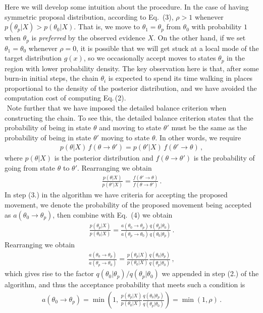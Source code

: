\documentclass[11pt]{article}
\theoremstyle{break}
\theoremstyle{break}
\begin{document}
${}$\qquad Here we will develop some intuition about the procedure. In the case of having symmetric proposal distribution, according to Eq.\ (3), $\rho > 1$ whenever $p(\theta_p|X) > p(\theta_0|X)$. That is, we move to $\theta_1 = \theta_p$ from $\theta_0$ with probability $1$ when $\theta_p$ is \textit{preferred} by the observed evidence $X$. On the other hand, if we set $\theta_1 = \theta_0$ whenever $\rho = 0$, it is possible that we will get stuck at a local mode of the target distribution $g(x)$, so we occasionally accept moves to states $\theta_p$ in the region with lower probability density. The key observation here is that, after some burn-in initial steps, the chain $\theta_i$ is expected to spend its time walking in places proportional to the density of the posterior distribution, and we have avoided the computation cost of computing Eq.\,(2). \\

${}$\qquad 
Note further that we have imposed the detailed balance criterion when constructing the chain. To see this, the detailed balance criterion states that the probability of being in state $\theta$ and moving to state $\theta'$ must be the same as the probability of being in state $\theta'$ moving to state $\theta$. In other words, we require
\begin{align*}
{p(\theta|X)\, f(\theta\to\theta')}={p(\theta'|X)\, f(\theta'\to\theta)}\,,
\end{align*}
where $p(\theta|X)$ is the posterior distribution and $f(\theta\to\theta')$ is the probability of going from state $\theta$ to $\theta'$. Rearranging we obtain
\begin{align}
\frac{p(\theta|X)}{p(\theta'|X)} = \frac{f(\theta'\to\theta)}{f(\theta\to\theta')}\,.
\end{align}
In step (3.) in the algorithm we have criteria for accepting the proposed movement, we denote the probability of the proposed movement being accepted as $a(\theta_0\to \theta_p)$, then combine with Eq.\ (4) we obtain
\begin{align*}
\frac{p(\theta_p|X)}{p(\theta_0|X)} = \frac{a(\theta_0\to\theta_p)\, q(\theta_p| \theta_0)}{a(\theta_p\to\theta_0)\, q(\theta_0|\theta_p)}\,.
\end{align*}
Rearranging we obtain
\begin{align*}
\frac{a(\theta_0\to\theta_p)}{a(\theta_p\to\theta_0)}
= \frac{p(\theta_p|X)}{p(\theta_0|X)} \frac{q(\theta_0|\theta_p)}{q(\theta_p|\theta_0)}\,,
\end{align*}
which gives rise to the factor $q(\theta_0|\theta_p)/q(\theta_p|\theta_0)$ we appended in step (2.) of the algorithm, and thus the acceptance probability that meets such a condition is
\begin{align}
a(\theta_0 \to \theta_p) = \min\left(1, \,  \frac{p(\theta_p|X)}{p(\theta_0|X)} \frac{q(\theta_0|\theta_p)}{q(\theta_p|\theta_0)}\right) = \min\left( 1 , \rho\right)\,.
\end{align}
\end{document}
